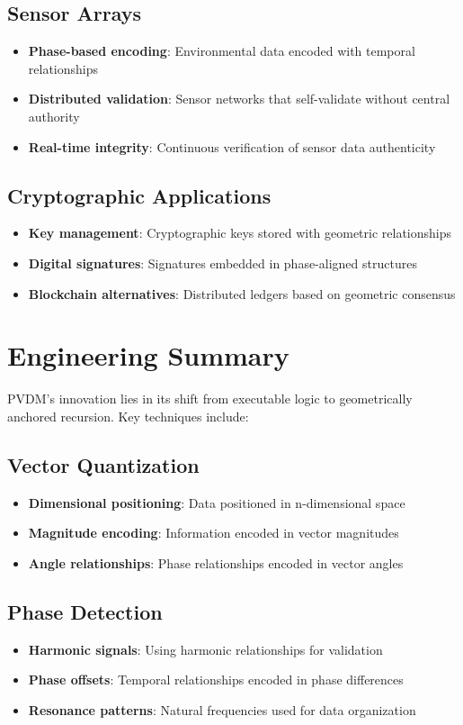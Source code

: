 \documentclass[12pt,a4paper]{article}
\begin{document}
\subsection{Sensor Arrays}
\begin{itemize}
    \item \textbf{Phase-based encoding}: Environmental data encoded with temporal relationships
    \item \textbf{Distributed validation}: Sensor networks that self-validate without central authority
    \item \textbf{Real-time integrity}: Continuous verification of sensor data authenticity
\end{itemize}

\subsection{Cryptographic Applications}
\begin{itemize}
    \item \textbf{Key management}: Cryptographic keys stored with geometric relationships
    \item \textbf{Digital signatures}: Signatures embedded in phase-aligned structures
    \item \textbf{Blockchain alternatives}: Distributed ledgers based on geometric consensus
\end{itemize}

\section{Engineering Summary}

PVDM's innovation lies in its shift from executable logic to geometrically anchored recursion. Key techniques include:

\subsection{Vector Quantization}
\begin{itemize}
    \item \textbf{Dimensional positioning}: Data positioned in n-dimensional space
    \item \textbf{Magnitude encoding}: Information encoded in vector magnitudes
    \item \textbf{Angle relationships}: Phase relationships encoded in vector angles
\end{itemize}

\subsection{Phase Detection}
\begin{itemize}
    \item \textbf{Harmonic signals}: Using harmonic relationships for validation
    \item \textbf{Phase offsets}: Temporal relationships encoded in phase differences
    \item \textbf{Resonance patterns}: Natural frequencies used for data organization
\end{itemize}
\end{document}
